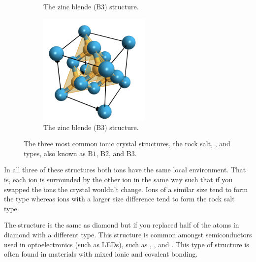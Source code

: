 \documentclass[fleqn]{NotesClass}
\begin{document}
\begin{figure}
\begin{subfigure}{0.6\textwidth}
            \caption[Zinc blende structure.]{The zinc blende (\(\mathrm{B3}\)) structure.}
        \end{subfigure}
        \begin{subfigure}{0.6\textwidth}
            \centering
            \includegraphics[width=0.6\textwidth]{images/ZnS2.pdf}
            \caption[Zinc blende structure.]{The zinc blende (\(\mathrm{B3}\)) structure.}
        \end{subfigure}
        \caption[Common ionic crystal structures.]{The three most common ionic crystal structures, the rock salt, , and  types, also known as \(\mathrm{B1}\), \(\mathrm{B2}\), and \(\mathrm{B3}\).}
        \label{fig:common ionic crystal structures}
    \end{figure}
    
    In all three of these structures both ions have the same local environment.
    That is, each ion is surrounded by the other ion in the same way such that if you swapped the ions the crystal wouldn't change.
    Ions of a similar size tend to form the  type whereas ions with a larger size difference tend to form the rock salt type.
    
    The  structure is the same as diamond but if you replaced half of the atoms in diamond with a different type.
    This structure is common amongst semiconductors used in optoelectronics (such as LEDs), such as , , and .
    This type of structure is often found in materials with mixed ionic and covalent bonding.
    
\end{document}
